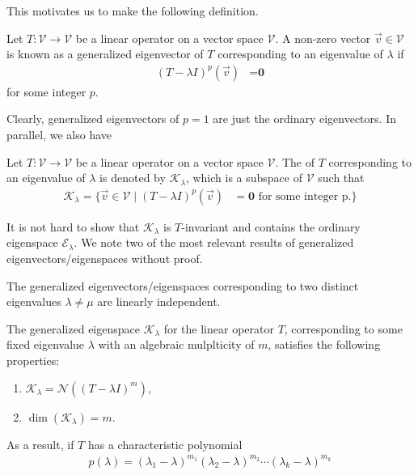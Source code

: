 This motivates us to make the following definition.
\begin{defn}
Let $T: \mathcal{V} \to \mathcal{V}$ be a linear operator on a vector space $\mathcal{V}$. A non-zero vector $\vec{v} \in \mathcal{V}$ is known as a generalized eigenvector of $T$ corresponding to an eigenvalue of $\lambda$ if
\begin{align}
(T - \lambda I)^p(\vec{v}) &= \textbf{0}
\end{align}
for some integer $p$.
\end{defn}
Clearly, generalized eigenvectors of $p=1$ are just the ordinary eigenvectors. In parallel, we also have
\begin{defn}
Let $T: \mathcal{V} \to \mathcal{V}$ be a linear operator on a vector space $\mathcal{V}$. The  of $T$ corresponding to an eigenvalue of $\lambda$ is denoted by $\mathcal{K}_\lambda$, which is a subspace of $\mathcal{V}$ such that
\begin{align}
\mathcal{K}_\lambda = \{\vec{v} \in \mathcal{V} \mid (T - \lambda I)^p(\vec{v}) &= \textbf{0} \text{ for some integer p.}\}
\end{align}
\end{defn}
It is not hard to show that $\mathcal{K}_\lambda$ is $T$-invariant and contains the ordinary eigenspace $\mathcal{E}_\lambda$. We note two of the most relevant results of generalized eigenvectors/eigenspaces without proof.
\begin{proper}
The generalized eigenvectors/eigenspaces corresponding to two distinct eigenvalues $\lambda \neq \mu$ are linearly independent.
\end{proper}
\begin{proper}
The generalized eigenspace $\mathcal{K}_\lambda$ for the linear operator $T$, corresponding to some fixed eigenvalue $\lambda$ with an algebraic mulplticity of $m$, satisfies the following properties:
\begin{enumerate}
    \item $\mathcal{K}_\lambda = \mathcal{N}((T-\lambda I)^m)$,
    \item $\dim(\mathcal{K}_\lambda) = m$.
\end{enumerate}
\end{proper}
As a result, if $T$ has a characteristic polynomial
\begin{align}
p(\lambda) = (\lambda_1-\lambda)^{m_1}(\lambda_2-\lambda)^{m_2}\cdots(\lambda_k-\lambda)^{m_k} \label{eqn:lambdammm}
\end{align}
